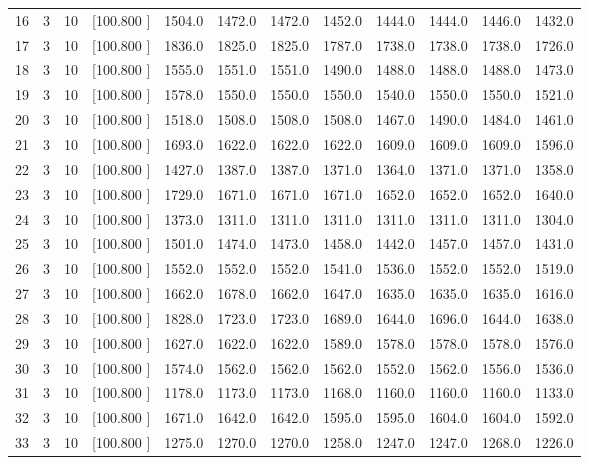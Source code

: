 \documentclass[12pt,a4paper]{article}
\begin{document}
\begin{center}
{\begin{tabular}{r r r r r r r r r r r r}
  16&  3& 10&[100.800   ]&  1504.0&  1472.0&  1472.0&  1452.0&  1444.0&  1444.0&  1446.0&  1432.0\\[-0.02in]
  17&  3& 10&[100.800   ]&  1836.0&  1825.0&  1825.0&  1787.0&  1738.0&  1738.0&  1738.0&  1726.0\\[-0.02in]
  18&  3& 10&[100.800   ]&  1555.0&  1551.0&  1551.0&  1490.0&  1488.0&  1488.0&  1488.0&  1473.0\\[-0.02in]
  19&  3& 10&[100.800   ]&  1578.0&  1550.0&  1550.0&  1550.0&  1540.0&  1550.0&  1550.0&  1521.0\\[-0.02in]
  20&  3& 10&[100.800   ]&  1518.0&  1508.0&  1508.0&  1508.0&  1467.0&  1490.0&  1484.0&  1461.0\\[-0.02in]
  21&  3& 10&[100.800   ]&  1693.0&  1622.0&  1622.0&  1622.0&  1609.0&  1609.0&  1609.0&  1596.0\\[-0.02in]
  22&  3& 10&[100.800   ]&  1427.0&  1387.0&  1387.0&  1371.0&  1364.0&  1371.0&  1371.0&  1358.0\\[-0.02in]
  23&  3& 10&[100.800   ]&  1729.0&  1671.0&  1671.0&  1671.0&  1652.0&  1652.0&  1652.0&  1640.0\\[-0.02in]
  24&  3& 10&[100.800   ]&  1373.0&  1311.0&  1311.0&  1311.0&  1311.0&  1311.0&  1311.0&  1304.0\\[-0.02in]
  25&  3& 10&[100.800   ]&  1501.0&  1474.0&  1473.0&  1458.0&  1442.0&  1457.0&  1457.0&  1431.0\\[-0.02in]
  26&  3& 10&[100.800   ]&  1552.0&  1552.0&  1552.0&  1541.0&  1536.0&  1552.0&  1552.0&  1519.0\\[-0.02in]
  27&  3& 10&[100.800   ]&  1662.0&  1678.0&  1662.0&  1647.0&  1635.0&  1635.0&  1635.0&  1616.0\\[-0.02in]
  28&  3& 10&[100.800   ]&  1828.0&  1723.0&  1723.0&  1689.0&  1644.0&  1696.0&  1644.0&  1638.0\\[-0.02in]
  29&  3& 10&[100.800   ]&  1627.0&  1622.0&  1622.0&  1589.0&  1578.0&  1578.0&  1578.0&  1576.0\\[-0.02in]
  30&  3& 10&[100.800   ]&  1574.0&  1562.0&  1562.0&  1562.0&  1552.0&  1562.0&  1556.0&  1536.0\\[-0.02in]
  31&  3& 10&[100.800   ]&  1178.0&  1173.0&  1173.0&  1168.0&  1160.0&  1160.0&  1160.0&  1133.0\\[-0.02in]
  32&  3& 10&[100.800   ]&  1671.0&  1642.0&  1642.0&  1595.0&  1595.0&  1604.0&  1604.0&  1592.0\\[-0.02in]
  33&  3& 10&[100.800   ]&  1275.0&  1270.0&  1270.0&  1258.0&  1247.0&  1247.0&  1268.0&  1226.0\\[-0.02in]

\end{tabular}}
\end{center}
\end{document}
